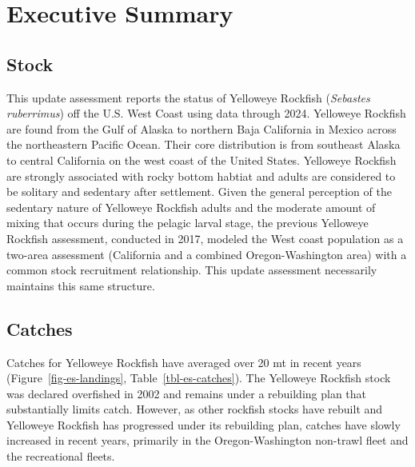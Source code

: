 \documentclass[
]{scrartcl}
\begin{document}
\newpage{}

\newpage{}


\section*{Executive Summary}\label{executive-summary}

\subsection*{Stock}\label{stock}

This update assessment reports the status of Yelloweye Rockfish
(\emph{Sebastes ruberrimus}) off the U.S. West Coast using data through
2024. Yelloweye Rockfish are found from the Gulf of Alaska to northern
Baja California in Mexico across the northeastern Pacific Ocean. Their
core distribution is from southeast Alaska to central California on the
west coast of the United States. Yelloweye Rockfish are strongly
associated with rocky bottom habtiat and adults are considered to be
solitary and sedentary after settlement. Given the general perception of
the sedentary nature of Yelloweye Rockfish adults and the moderate
amount of mixing that occurs during the pelagic larval stage, the
previous Yelloweye Rockfish assessment, conducted in 2017, modeled the
West coast population as a two-area assessment (California and a
combined Oregon-Washington area) with a common stock recruitment
relationship. This update assessment necessarily maintains this same
structure.

\subsection*{Catches}\label{catches}

Catches for Yelloweye Rockfish have averaged over 20 mt in recent years
(Figure~\ref{fig-es-landings}, Table~\ref{tbl-es-catches}). The
Yelloweye Rockfish stock was declared overfished in 2002 and remains
under a rebuilding plan that substantially limits catch. However, as
other rockfish stocks have rebuilt and Yelloweye Rockfish has progressed
under its rebuilding plan, catches have slowly increased in recent
years, primarily in the Oregon-Washington non-trawl fleet and the
recreational fleets.
\end{document}
